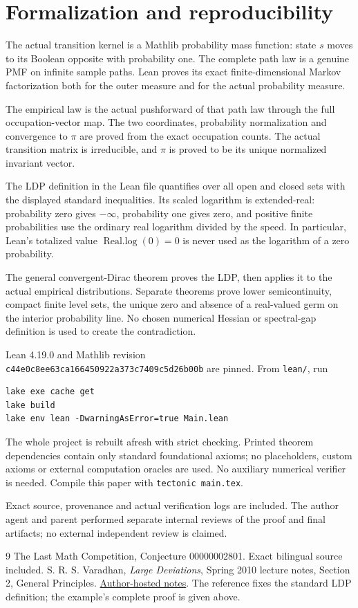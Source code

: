 \documentclass[11pt]{article}
\begin{document}
\newpage
\section*{Formalization and reproducibility}
The actual transition kernel is a Mathlib probability
mass function: state $s$ moves to its Boolean opposite
with probability one. The complete path law is a genuine
PMF on infinite sample paths. Lean proves its exact
finite-dimensional Markov factorization both for the
outer measure and for the actual probability measure.

The empirical law is the actual pushforward of that
path law through the full occupation-vector map. The
two coordinates, probability normalization and convergence
to $\pi$ are proved from the exact occupation counts.
The actual transition matrix is irreducible, and $\pi$
is proved to be its unique normalized invariant vector.

The LDP definition in the Lean file quantifies over all
open and closed sets with the displayed standard
inequalities. Its scaled logarithm is extended-real:
probability zero gives $-\infty$, probability one gives
zero, and positive finite probabilities use the ordinary
real logarithm divided by the speed. In particular,
Lean's totalized value $\operatorname{Real.log}(0)=0$
is never used as the logarithm of a zero probability.

The general convergent-Dirac theorem proves the LDP,
then applies it to the actual empirical distributions.
Separate theorems prove lower semicontinuity, compact
finite level sets, the unique zero and absence of a
real-valued germ on the interior probability line.
No chosen numerical Hessian or spectral-gap definition
is used to create the contradiction.

Lean 4.19.0 and Mathlib revision\\
\texttt{c44e0c8ee63ca166450922a373c7409c5d26b00b}
are pinned. From \texttt{lean/}, run
\begin{verbatim}
lake exe cache get
lake build
lake env lean -DwarningAsError=true Main.lean
\end{verbatim}
The whole project is rebuilt afresh with strict checking.
Printed theorem dependencies contain only standard
foundational axioms; no placeholders, custom axioms or
external computation oracles are used. No auxiliary
numerical verifier is needed. Compile this paper with
\texttt{tectonic main.tex}.

Exact source, provenance and actual verification logs
are included. The author agent and parent performed
separate internal reviews of the proof and final
artifacts; no external independent review is claimed.

\begin{thebibliography}{9}
 The Last Math Competition,
Conjecture 00000002801. Exact bilingual source included.
 S. R. S. Varadhan,
\emph{Large Deviations}, Spring 2010 lecture notes,
Section 2, General Principles.
\href{https://math.nyu.edu/faculty/varadhan/LDP/1-2.pdf}{Author-hosted notes}.
The reference fixes the standard LDP definition;
the example's complete proof is given above.
\end{thebibliography}
\end{document}
